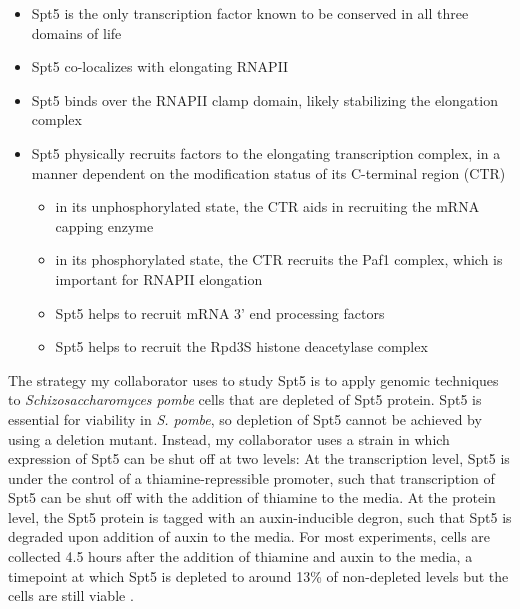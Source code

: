 \documentclass[9pt, letterpaper]{article}
\begin{document}
\begin{itemize}[nosep, topsep=.5em]
    \item Spt5 is the only transcription factor known to be conserved in all three domains of life \cite{hartzog2013, werner2012}
    \item Spt5 co-localizes with elongating RNAPII \cite{mayer2010, rahl2010}
    \item Spt5 binds over the RNAPII clamp domain, likely stabilizing the elongation complex \cite{hirtreiter2010, klein2011, martinez-rucobo2011}
    \item Spt5 physically recruits factors to the elongating transcription complex, in a manner dependent on the modification status of its C-terminal region (CTR) \cite{hartzog2013}
    \begin{itemize}[nosep]
        \item in its unphosphorylated state, the CTR aids in recruiting the mRNA capping enzyme \cite{doamekpor2014, doamekpor2015, schneider2010, wen1999}
        \item in its phosphorylated state, the CTR recruits the Paf1 complex, which is important for RNAPII elongation \cite{liu2009, mbogning2013, wier2013, zhou2009}
        \item Spt5 helps to recruit mRNA 3' end processing factors \cite{mayer2012, stadelmayer2014, yamamoto2014}
        \item Spt5 helps to recruit the Rpd3S histone deacetylase complex \cite{drouin2010}
    \end{itemize}
\end{itemize}

The strategy my collaborator uses to study Spt5 is to apply genomic techniques to \textit{Schizosaccharomyces pombe} cells that are depleted of Spt5 protein. Spt5 is essential for viability in \textit{S. pombe}, so depletion of Spt5 cannot be achieved by using a deletion mutant. Instead, my collaborator uses a strain in which expression of Spt5 can be shut off at two levels: At the transcription level, Spt5 is under the control of a thiamine-repressible promoter, such that transcription of Spt5 can be shut off with the addition of thiamine to the media. At the protein level, the Spt5 protein is tagged with an auxin-inducible degron, such that Spt5 is degraded upon addition of auxin to the media. For most experiments, cells are collected 4.5 hours after the addition of thiamine and auxin to the media, a timepoint at which Spt5 is depleted to around 13\% of non-depleted levels but the cells are still viable \cite{shetty2017}.
\end{document}
